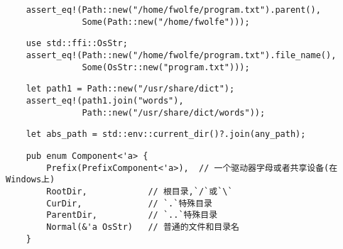 \begin{verbatim}
    assert_eq!(Path::new("/home/fwolfe/program.txt").parent(),
               Some(Path::new("/home/fwolfe")));
\end{verbatim}

\begin{verbatim}
    use std::ffi::OsStr;
    assert_eq!(Path::new("/home/fwolfe/program.txt").file_name(),
               Some(OsStr::new("program.txt")));
\end{verbatim}


\begin{verbatim}
    let path1 = Path::new("/usr/share/dict");
    assert_eq!(path1.join("words"),
               Path::new("/usr/share/dict/words"));
\end{verbatim}
\begin{verbatim}
    let abs_path = std::env::current_dir()?.join(any_path);
\end{verbatim}

\begin{verbatim}
    pub enum Component<'a> {
        Prefix(PrefixComponent<'a>),  // 一个驱动器字母或者共享设备(在Windows上)
        RootDir,            // 根目录,`/`或`\`
        CurDir,             // `.`特殊目录
        ParentDir,          // `..`特殊目录
        Normal(&'a OsStr)   // 普通的文件和目录名
    }
\end{verbatim}

